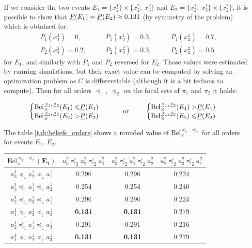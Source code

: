 \begin{example}
If we consider the two events $E_1=\{x^1_2\}\times\{x^2_2,~x^2_3\}$ and $E_2=\{x^1_2,~x^1_3\}\times\{x^2_2\}$, it is possible to show that ${\underline{P}}(E_1)={\underline{P}}(E_2)\approx0.131$ (by symmetry of the problem) which is obtained for:
\begin{align*}
    &P_1(x^1_1)=0, \qquad&P_1(x^1_2)=0.3, \qquad&P_1(x^1_3)=0.7,\\
    &P_2(x^2_1)=0.2, \qquad&P_2(x^2_2)=0.3, \qquad&P_2(x^2_3)=0.5
\end{align*}
for $E_1$, and similarly with $P_1$ and $P_2$ reversed for $E_2$. Those values were estimated by running simulations, but their exact value can be computed by solving an optimization problem as $C$ is differentiable (although it is a bit tedious to compute). Then for all orders $\preceq_1,~\preceq_2$ on the focal sets of $\pi_1$ and $\pi_2$ it holds:

 \begin{align*}
    \begin{cases}
        \begin{split}
            \mathrm{Bel}_\times^{\preceq_1,\preceq_2}(E_1) \leqslant& {\underline{P}}(E_1)\\
            \mathrm{Bel}_\times^{\preceq_1,\preceq_2}(E_2) >& {\underline{P}}(E_2)
        \end{split}
    \end{cases}
    \qquad\text{ or }\qquad
    \begin{cases}
        \begin{split}
            \mathrm{Bel}_\times^{\preceq_1,\preceq_2}(E_1) >& {\underline{P}}(E_1)\\
            \mathrm{Bel}_\times^{\preceq_1,\preceq_2}(E_2) \leqslant& {\underline{P}}(E_2)
        \end{split}
    \end{cases}
\end{align*}

The table \ref{tab:beliefs_orders} shows a rounded value of $\mathrm{Bel}^{\preceq_1,\preceq_2}_\times$ for all orders for events $E_1$, $E_2$.

\begin{center}
\begin{tabular}{|c||c|c|c|}
\hline
$\mathrm{Bel}^{\preceq_1,\preceq_2}_\times(\mathbf{E_1})$ & $a^2_3\preceq_2a^2_2\preceq_2a^2_1$ & $a^2_3\preceq_2a^2_1\preceq_2a^2_2$ & $a^2_2\preceq_2a^2_3\preceq_2a^2_1$ \\ \hline\hline
$a^1_3\preceq_1a^1_2\preceq_1a^1_1$ & 0.296 & 0.296 & 0.224 \\ \hline
$a^1_3\preceq_1a^1_1\preceq_1a^1_2$ & 0.254 & 0.254 & 0.240 \\ \hline
$a^1_2\preceq_1a^1_3\preceq_1a^1_1$ & 0.296 & 0.296 & 0.224 \\ \hline
$a^1_1\preceq_1a^1_3\preceq_1a^1_2$ & \textbf{0.131} & \textbf{0.131} & 0.279 \\ \hline
$a^1_2\preceq_1a^1_1\preceq_1a^1_3$ & 0.291 & 0.291 & 0.216 \\ \hline
$a^1_1\preceq_1a^1_2\preceq_1a^1_3$ & \textbf{0.131} & \textbf{0.131} & 0.279 \\ \hline
\end{tabular}


\end{center}
\end{example}
